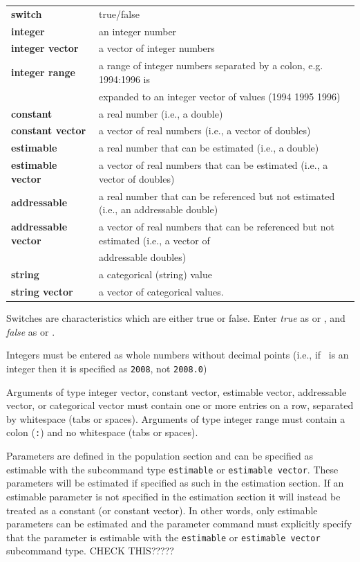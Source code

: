 \begin{tabular}{ll}
\textbf{switch} & true/false \\
\textbf{integer}& an integer number \\
\textbf{integer vector} & a vector of integer numbers \\
\textbf{integer range} & a range of integer numbers separated by a colon, e.g. 1994:1996 is \\ & expanded to an integer vector of values (1994 1995 1996) \\
\textbf{constant} & a real number (i.e., a double) \\
\textbf{constant vector} & a vector of real numbers (i.e., a vector of doubles) \\
\textbf{estimable} & a real number that can be estimated (i.e., a double) \\
\textbf{estimable vector} & a vector of real numbers that can be estimated (i.e., a vector of doubles) \\
\textbf{addressable} & a real number that can be referenced but not estimated (i.e., an addressable double) \\
\textbf{addressable vector} & a vector of real numbers that can be referenced but not estimated (i.e., a vector of \\ & addressable doubles) \\
\textbf{string} & a categorical (string) value \\
\textbf{string vector} & a vector of categorical values.
\end{tabular}

Switches are characteristics which are either true or false. Enter \emph{true} as  or , and \emph{false} as  or .

Integers must be entered as whole numbers without decimal points (i.e., if \ is an integer then it is specified as \texttt{2008}, not \texttt{2008.0})

Arguments of type integer vector, constant vector, estimable vector, addressable vector, or categorical vector must contain one or more entries on a row, separated by whitespace (tabs or spaces). Arguments of type integer range must contain a colon (\texttt{:}) and no whitespace (tabs or spaces).

Parameters are defined in the population section and can be specified as estimable with the subcommand type \texttt{estimable} or \texttt{estimable vector}.  These parameters will be estimated if specified as such in the estimation section. If an estimable parameter is not specified in the estimation section it will instead be treated as a constant (or constant vector). In other words, only estimable parameters can be estimated and the parameter command must explicitly specify that the parameter is estimable with the \texttt{estimable} or \texttt{estimable vector} subcommand type. CHECK THIS?????


